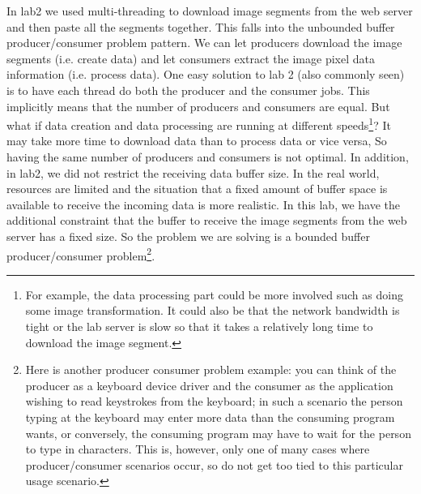 In lab2 we used multi-threading to download image segments from the web server and then paste all the segments together. This falls into the unbounded buffer producer/consumer problem pattern. We can let producers download the image segments (i.e. create data) and let consumers extract the image pixel data information (i.e. process data). One easy solution to lab 2 (also commonly seen) is to have each thread do both the producer and the consumer jobs. This implicitly means that the number of producers and consumers are equal. But what if data creation and data processing are running at different speeds\footnote{For example, the data processing part could be more involved such as doing some image transformation. It could also be that the network bandwidth is tight or the lab server is slow so that it takes a relatively long time to download the image segment.}? It may take more time to download data than to process data or vice versa, So having the same number of producers and consumers is not optimal. In addition, in lab2, we did not restrict the receiving data buffer size. In the real world, resources are limited and the situation that a fixed amount of buffer space is available to receive the incoming data is more realistic. In this lab, we have the additional constraint that the buffer to receive the image segments from the web server has a fixed size. So the problem we are solving is a bounded buffer producer/consumer problem\footnote{Here is another producer consumer problem example: you can think of the producer as a keyboard device driver and the consumer as the application wishing to read keystrokes from the keyboard; in such a scenario the person typing at the keyboard may enter more data than the consuming  program wants, or conversely, the consuming program may have to wait  for the person to type in characters. This is, however, only one of many cases where producer/consumer scenarios occur, so do not get too tied to this particular usage scenario.}.





